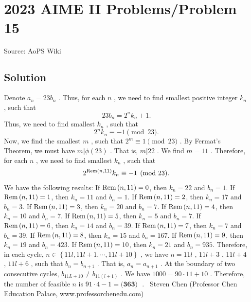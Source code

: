 \documentclass[12pt]{article}
\begin{document}
\section*{{2023 AIME II Problems/Problem 15}}
Source: AoPS Wiki

\subsection*{Solution}
Denote $a_n = 23 b_n$ .
Thus, for each $n$ , we need to find smallest positive integer $k_n$ , such that \[ 23 b_n = 2^n k_n + 1 . \] Thus, we need to find smallest $k_n$ , such that \[ 2^n k_n \equiv - 1 \pmod{23} . \] Now, we find the smallest $m$ , such that $2^m \equiv 1 \pmod{23}$ .
By Fermat's Theorem, we must have $m | \phi \left( 23 \right)$ . That is, $m | 22$ .
We find $m = 11$ . Therefore, for each $n$ , we need to find smallest $k_n$ , such that \[ 2^{{\rm Rem} \left( n , 11 \right)} k_n \equiv - 1 \pmod{23} . \] We have the following results: If \({\rm Rem} \left( n , 11 \right) = 0\), then \(k_n = 22\) and \(b_n = 1\). If \({\rm Rem} \left( n , 11 \right) = 1\), then \(k_n = 11\) and \(b_n = 1\). If \({\rm Rem} \left( n , 11 \right) = 2\), then \(k_n = 17\) and \(b_n = 3\). If \({\rm Rem} \left( n , 11 \right) = 3\), then \(k_n = 20\) and \(b_n = 7\). If \({\rm Rem} \left( n , 11 \right) = 4\), then \(k_n = 10\) and \(b_n = 7\). If \({\rm Rem} \left( n , 11 \right) = 5\), then \(k_n = 5\) and \(b_n = 7\). If \({\rm Rem} \left( n , 11 \right) = 6\), then \(k_n = 14\) and \(b_n = 39\). If \({\rm Rem} \left( n , 11 \right) = 7\), then \(k_n = 7\) and \(b_n = 39\). If \({\rm Rem} \left( n , 11 \right) = 8\), then \(k_n = 15\) and \(b_n = 167\). If \({\rm Rem} \left( n , 11 \right) = 9\), then \(k_n = 19\) and \(b_n = 423\). If \({\rm Rem} \left( n , 11 \right) = 10\), then \(k_n = 21\) and \(b_n = 935\). Therefore, in each cycle, $n \in \left\{ 11 l , 11l + 1 , \cdots , 11l + 10 \right\}$ , we have $n = 11l$ , $11l + 3$ , $11l + 4$ , $11l + 6$ , such that $b_n = b_{n+1}$ . That is, $a_n = a_{n+1}$ .
At the boundary of two consecutive cycles, $b_{11L + 10} \neq b_{11 \left(l + 1 \right)}$ . We have $1000 = 90 \cdot 11 + 10$ .
Therefore, the number of feasible $n$ is $91 \cdot 4 - 1 = \boxed{\textbf{(363) }}$ . ~Steven Chen (Professor Chen Education Palace, www.professorchenedu.com)
\end{document}

